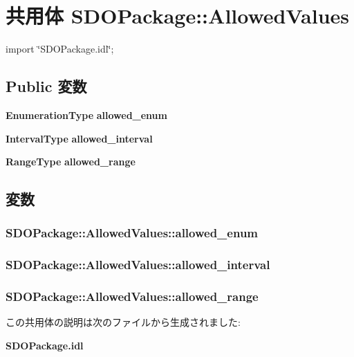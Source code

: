 \section{共用体 SDOPackage::AllowedValues}
\label{unionSDOPackage_1_1AllowedValues}


{\ttfamily import \char`\"{}SDOPackage.idl\char`\"{};}

\subsection*{Public 変数}
\begin{DoxyCompactItemize}
\item 
{\bf EnumerationType} {\bf allowed\_\-enum}
\item 
{\bf IntervalType} {\bf allowed\_\-interval}
\item 
{\bf RangeType} {\bf allowed\_\-range}
\end{DoxyCompactItemize}


\subsection{変数}
\subsubsection[{allowed\_\-enum}]{ {\bf SDOPackage::AllowedValues::allowed\_\-enum}}\label{unionSDOPackage_1_1AllowedValues_a52aa4da4d48dbaaa00f065a39b084507}
\subsubsection[{allowed\_\-interval}]{ {\bf SDOPackage::AllowedValues::allowed\_\-interval}}\label{unionSDOPackage_1_1AllowedValues_a9c74705f12153ddb248be33042e94208}
\subsubsection[{allowed\_\-range}]{ {\bf SDOPackage::AllowedValues::allowed\_\-range}}\label{unionSDOPackage_1_1AllowedValues_a9b722e71505439c91edf4d81429c6e84}


この共用体の説明は次のファイルから生成されました:\begin{DoxyCompactItemize}
\item 
{\bf SDOPackage.idl}\end{DoxyCompactItemize}
